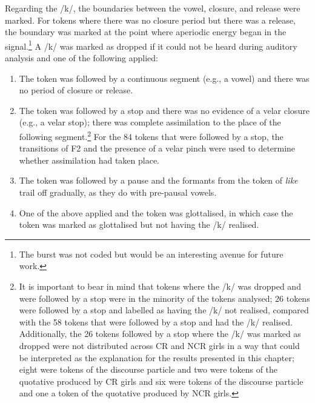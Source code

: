 
Regarding the /k/, the boundaries between the vowel, closure, and release were marked. For tokens where there was no closure period but there was a release, the boundary was marked at the point where aperiodic energy began in the signal.\footnote{The burst was not coded but would be an interesting avenue for future work.} A /k/ was marked as dropped if it could not be heard during auditory analysis and one of the following applied:

\begin{enumerate}
	\item The token was followed by a continuous segment (e.g., a vowel) and there was no period of closure or release.
	\item The token was followed by a stop and there was no evidence of a velar closure (e.g., a velar stop); there was complete assimilation to the place of the following segment.\footnote{It is important to bear in mind that tokens where the /k/ was dropped and were followed by a stop were in the minority of the tokens analysed; 26 tokens were followed by a stop and labelled as having the /k/ not realised, compared with the 58 tokens that were followed by a stop and had the /k/ realised. Additionally, the 26 tokens followed by a stop where the /k/ was marked as dropped were not distributed across CR and NCR girls in a way that could be interpreted as the explanation for the results presented in this chapter; eight were tokens of the discourse particle and two were tokens of the quotative produced by CR girls and six were tokens of the discourse particle and one a token of the quotative produced by NCR girls.} For the 84 tokens that were followed by a stop, the transitions of F2 and the presence of a velar pinch \citep[89]{harringtoncassidy1999} were used to determine whether assimilation had taken place.
	\item The token was followed by a pause and the formants from the token of \textit{like} trail off gradually, as they do with pre-pausal vowels.
	\item One of the above applied and the token was glottalised, in which case the token was marked as glottalised but not having the /k/ realised.
\end{enumerate}

